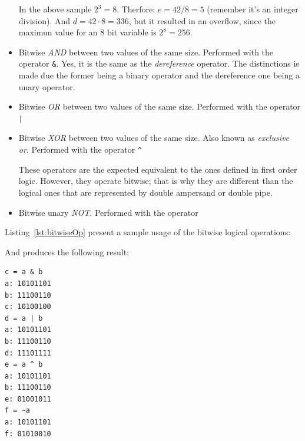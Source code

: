 \begin{itemize}
In the above sample $2^3 = 8$. Therfore: $e = 42 / 8 = 5$ (remember it's an integer division).
And $d = 42 \cdot 8 = 336$, but it resulted in an overflow, since the maximun value for an $8$ bit variable is $2^8 = 256$.

\item Bitwise \emph{AND} between two values of the same size. Performed with the operator \texttt{&}. Yes, it is the same as the \emph{dereference} operator. The distinctions is made due the former being a binary operator and the dereference one being a unary operator.
\item Bitwise \emph{OR} between two values of the same size. Performed with the operator \texttt{|}
\item Bitwise \emph{XOR} between two values of the same size. Also known as \emph{exclusive or}. Performed with the operator \texttt{^}

These operators are the expected equivalent to the ones defined in first order logic.
However, they operate bitwise; that is why they are different than the logical ones that are represented by double ampersand or double pipe.

\item Bitwise unary \emph{NOT}. Performed with the operator \texttt{~}
\end{itemize}

Listing~\ref{lst:bitwiseOp} present a sample usage of the bitwise logical operations:

{\centering
\begin{minipage}{\linewidth}
\end{minipage}
\par
}

And produces the following result:

\begin{verbatim}
c = a & b
a: 10101101
b: 11100110
c: 10100100
d = a | b
a: 10101101
b: 11100110
d: 11101111
e = a ^ b
a: 10101101
b: 11100110
e: 01001011
f = ~a
a: 10101101
f: 01010010
\end{verbatim}

